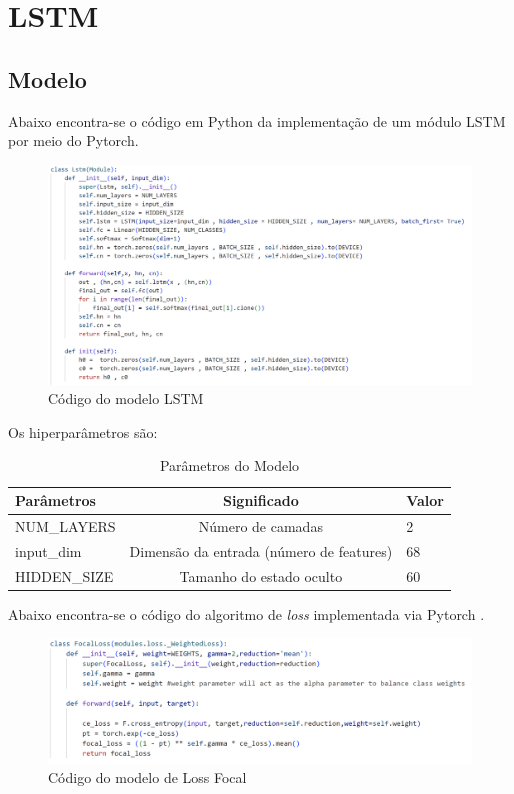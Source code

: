 \section{LSTM}

\subsection{Modelo}

Abaixo encontra-se o código em Python da implementação de um módulo LSTM por meio do Pytorch.

\begin{figure}[ht]
    \centering
    \includegraphics[scale=0.5]{tg1/figuras/codigo.png}
    \caption{Código do modelo LSTM}
    \label{fig:codigo_lstm}
\end{figure}

Os hiperparâmetros são:
\begin{table}[h]
    \centering
    \begin{tabular}{|l|c|l|}
        \hline
        \textbf{Parâmetros} & \textbf{Significado} & \textbf{Valor} \\
        \hline
        NUM\_LAYERS & Número de camadas & 2 \\
        input\_dim & Dimensão da entrada (número de features) &  68\\
        HIDDEN\_SIZE & Tamanho do estado oculto &  60\\
        \hline
    \end{tabular}
    \caption{Parâmetros do Modelo}
    \label{tab:hiperparametros}
\end{table}

Abaixo encontra-se o código do algoritmo de \textit{loss} implementada via Pytorch \cite{Lin_Goyal_Girshick_He_Dollar_2017}.

\begin{figure}[ht]
    \centering
    \includegraphics[scale=0.5]{tg1/figuras/loss.png}
    \caption{Código do modelo de Loss Focal}
    \label{fig:loss}
\end{figure}

